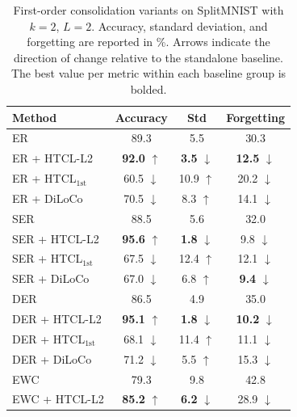 {\begin{table}[!htbp]
\centering
\caption{First-order consolidation variants on SplitMNIST with $k = 2$, $L = 2$. Accuracy, standard deviation, and forgetting are reported in \%. Arrows indicate the direction of change relative to the standalone baseline. The best value per metric within each baseline group is bolded.}
\label{tab:firstorder}
\small
\setlength{\tabcolsep}{6pt}
\renewcommand{\arraystretch}{1.05}
\begin{tabular}{lccc}
\toprule
Method & Accuracy & Std & Forgetting \\
\midrule
ER                                & 89.3              & \phantom{0}5.5              & 30.3 \\
ER + HTCL-L2                      & \textbf{92.0} $\uparrow$ & \phantom{0}\textbf{3.5} $\downarrow$ & \textbf{12.5} $\downarrow$ \\
ER + HTCL$_{\text{1st}}$          & 60.5 $\downarrow$ & 10.9 $\uparrow$            & 20.2 $\downarrow$ \\
ER + DiLoCo                       & 70.5 $\downarrow$ & \phantom{0}8.3 $\uparrow$  & 14.1 $\downarrow$ \\
\midrule
SER                               & 88.5              & \phantom{0}5.6              & 32.0 \\
SER + HTCL-L2                     & \textbf{95.6} $\uparrow$ & \phantom{0}\textbf{1.8} $\downarrow$ & \phantom{0}9.8 $\downarrow$ \\
SER + HTCL$_{\text{1st}}$         & 67.5 $\downarrow$ & 12.4 $\uparrow$            & 12.1 $\downarrow$ \\
SER + DiLoCo                      & 67.0 $\downarrow$ & \phantom{0}6.8 $\uparrow$  & \phantom{0}\textbf{9.4} $\downarrow$ \\
\midrule
DER                               & 86.5              & \phantom{0}4.9              & 35.0 \\
DER + HTCL-L2                     & \textbf{95.1} $\uparrow$ & \phantom{0}\textbf{1.8} $\downarrow$ & \textbf{10.2} $\downarrow$ \\
DER + HTCL$_{\text{1st}}$         & 68.1 $\downarrow$ & 11.4 $\uparrow$            & 11.1 $\downarrow$ \\
DER + DiLoCo                      & 71.2 $\downarrow$ & \phantom{0}5.5 $\uparrow$  & 15.3 $\downarrow$ \\
\midrule
EWC                               & 79.3              & \phantom{0}9.8              & 42.8 \\
EWC + HTCL-L2                     & \textbf{85.2} $\uparrow$ & \phantom{0}\textbf{6.2} $\downarrow$ & 28.9 $\downarrow$ \\

\end{tabular}
\end{table}}
